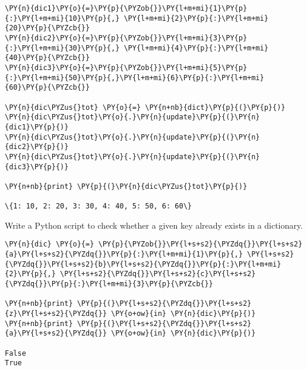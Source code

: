 \begin{Answer}
\begin{tcolorbox}[size=fbox, boxrule=1pt, colback=cellbackground, colframe=cellborder]
\begin{Verbatim}[commandchars=\\\{\}]
\PY{n}{dic1}\PY{o}{=}\PY{p}{\PYZob{}}\PY{l+m+mi}{1}\PY{p}{:}\PY{l+m+mi}{10}\PY{p}{,} \PY{l+m+mi}{2}\PY{p}{:}\PY{l+m+mi}{20}\PY{p}{\PYZcb{}}
\PY{n}{dic2}\PY{o}{=}\PY{p}{\PYZob{}}\PY{l+m+mi}{3}\PY{p}{:}\PY{l+m+mi}{30}\PY{p}{,} \PY{l+m+mi}{4}\PY{p}{:}\PY{l+m+mi}{40}\PY{p}{\PYZcb{}}
\PY{n}{dic3}\PY{o}{=}\PY{p}{\PYZob{}}\PY{l+m+mi}{5}\PY{p}{:}\PY{l+m+mi}{50}\PY{p}{,}\PY{l+m+mi}{6}\PY{p}{:}\PY{l+m+mi}{60}\PY{p}{\PYZcb{}}

\PY{n}{dic\PYZus{}tot} \PY{o}{=} \PY{n+nb}{dict}\PY{p}{(}\PY{p}{)}
\PY{n}{dic\PYZus{}tot}\PY{o}{.}\PY{n}{update}\PY{p}{(}\PY{n}{dic1}\PY{p}{)}
\PY{n}{dic\PYZus{}tot}\PY{o}{.}\PY{n}{update}\PY{p}{(}\PY{n}{dic2}\PY{p}{)}
\PY{n}{dic\PYZus{}tot}\PY{o}{.}\PY{n}{update}\PY{p}{(}\PY{n}{dic3}\PY{p}{)}

\PY{n+nb}{print} \PY{p}{(}\PY{n}{dic\PYZus{}tot}\PY{p}{)}

\{1: 10, 2: 20, 3: 30, 4: 40, 5: 50, 6: 60\}
\end{Verbatim}
\end{tcolorbox}
\end{Answer}

\begin{Exercise}
Write a Python script to check whether a given key already exists in a dictionary.
\end{Exercise}

\begin{Answer}
\begin{tcolorbox}[size=fbox, boxrule=1pt, colback=cellbackground, colframe=cellborder]
\begin{Verbatim}[commandchars=\\\{\}]
\PY{n}{dic} \PY{o}{=} \PY{p}{\PYZob{}}\PY{l+s+s2}{\PYZdq{}}\PY{l+s+s2}{a}\PY{l+s+s2}{\PYZdq{}}\PY{p}{:}\PY{l+m+mi}{1}\PY{p}{,} \PY{l+s+s2}{\PYZdq{}}\PY{l+s+s2}{b}\PY{l+s+s2}{\PYZdq{}}\PY{p}{:}\PY{l+m+mi}{2}\PY{p}{,} \PY{l+s+s2}{\PYZdq{}}\PY{l+s+s2}{c}\PY{l+s+s2}{\PYZdq{}}\PY{p}{:}\PY{l+m+mi}{3}\PY{p}{\PYZcb{}}

\PY{n+nb}{print} \PY{p}{(}\PY{l+s+s2}{\PYZdq{}}\PY{l+s+s2}{z}\PY{l+s+s2}{\PYZdq{}} \PY{o+ow}{in} \PY{n}{dic}\PY{p}{)}
\PY{n+nb}{print} \PY{p}{(}\PY{l+s+s2}{\PYZdq{}}\PY{l+s+s2}{a}\PY{l+s+s2}{\PYZdq{}} \PY{o+ow}{in} \PY{n}{dic}\PY{p}{)}

False
True
\end{Verbatim}
\end{tcolorbox}
\end{Answer}

